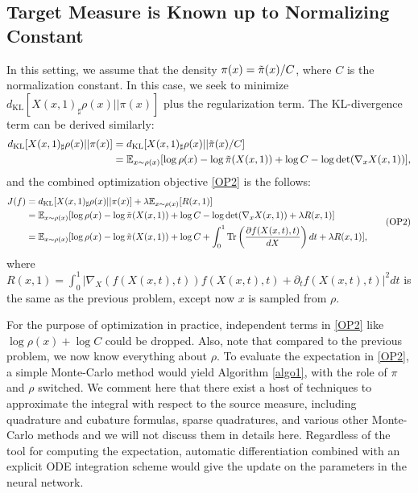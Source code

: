 \subsection{Target Measure is Known up to Normalizing Constant}
In this setting, we assume that the density $\pi(x) = \Tilde{\pi}(x)/C$, where $C$ is the normalization constant. In this case, we seek to minimize $d_\text{KL}[X(x,1)_\sharp\rho(x)||\pi(x)]$ plus the regularization term. The KL-divergence term can be derived similarly:
\begin{align*}
d_\text{KL}[X(x,1)_\sharp\rho(x)||\pi(x)] &=  d_\text{KL}[X(x,1)_\sharp\rho(x)||\Tilde{\pi}(x)/C] \\
&= \mathbb{E}_{x\sim\rho(x)}[\log\rho(x) - \log\Tilde{\pi}(X(x,1)) + \log C - \log\det(\nabla_x X(x,1))],
\end{align*}
and the combined optimization objective  \ref{OP2}  is the follows:
\begin{equation}\label{OP2}
\begin{aligned}
     J(f) &= d_\text{KL}[X(x,1)_\sharp\rho(x)||\pi(x)] + \lambda\mathbb{E}_{x\sim\rho(x)}[R(x,1)]\\
     &= \mathbb{E}_{x\sim\rho(x)}[\log\rho(x) - \log\Tilde{\pi}(X(x,1)) + \log C - \log\det(\nabla_x X(x,1)) + \lambda R(x,1)]\\
     &= \mathbb{E}_{x\sim\rho(x)}[\log\rho(x) - \log\Tilde{\pi}(X(x,1)) + \log C + \int_0^1\text{Tr}\left(\frac{\partial f(X(x,t),t)}{dX}\right)dt + \lambda R(x,1)],\\
\end{aligned}\tag{OP2}
\end{equation}
where $R(x,1) = \int_0^1  |\nabla_X(f(X(x,t),t))f(X(x,t),t) + \partial_tf(X(x,t),t)|^2dt$ is the same as the previous problem, except now $x$ is sampled from $\rho$.

For the purpose of optimization in practice, independent terms in \ref{OP2} like $\log\rho(x) + \log C$ could be dropped. Also, note that compared to the previous problem, we now know everything about $\rho$. To evaluate the expectation in \ref{OP2}, a simple Monte-Carlo method would yield Algorithm \ref{algo1}, with the role of $\pi$ and $\rho$ switched. We comment here that there exist a host of techniques to approximate the integral with respect to the source measure, including quadrature and cubature formulas, sparse quadratures, and various other Monte-Carlo methods and we will not discuss them in details here. Regardless of the tool for computing the expectation, automatic differentiation combined with an explicit ODE integration scheme would give the update on the parameters in the neural network. 
